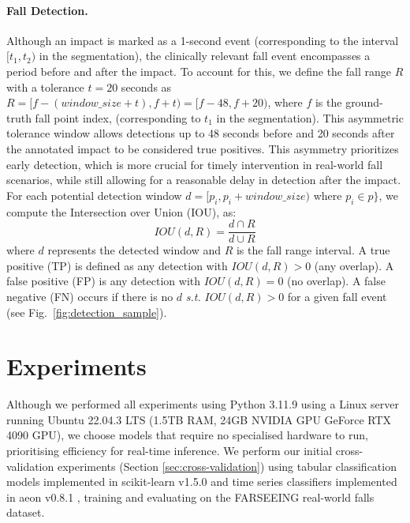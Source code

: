 \documentclass[runningheads]{llncs}
\begin{document}
\paragraph{Fall Detection.} Although an impact is marked as a 1-second event (corresponding to the interval $[t_1, t_2)$ in the segmentation), the clinically relevant fall event encompasses a period before and after the impact. To account for this, we define the fall range $R$ with a tolerance $t=20$ seconds as $R = [f-(window\_size+t), f+t)= [f-48,f+20)$, where $f$ is the ground-truth fall point index, (corresponding to $t_1$ in the segmentation). This asymmetric tolerance window allows detections up to 48 seconds before and 20 seconds after the annotated impact to be considered true positives. This asymmetry prioritizes early detection, which is more crucial for timely intervention in real-world fall scenarios, while still allowing for a reasonable delay in detection after the impact. For each potential detection window $d = [p_i, p_i+window\_size)$ where $p_i \in p\}$, we compute the Intersection over Union (IOU), as:
\begin{equation}
    IOU(d, R) = \frac{{ d \cap R}}{d \cup R}
\end{equation} 
where $d$ represents the detected window and $R$ is the fall range interval. A true positive (TP) is defined as any detection with  $IOU(d, R)>0$ (any overlap). A false positive (FP) is any detection with  $IOU(d, R)=0$ (no overlap). A false negative (FN) occurs if there is no $d$ \textit{s.t.} $IOU(d,R) > 0$ for a given fall event (see Fig.~\ref{fig:detection_sample}).

\section{Experiments}
\label{sec:experiments}


Although we performed all experiments using Python 3.11.9 using a Linux server running Ubuntu 22.04.3 LTS (1.5TB RAM, 24GB NVIDIA GPU GeForce RTX 4090 GPU), we choose models that require no specialised hardware to run, prioritising efficiency for real-time inference. We perform our initial cross-validation experiments (Section \ref{sec:cross-validation})  using tabular classification models implemented in scikit-learn v1.5.0 \cite{pedregosa2011scikit} and time series classifiers implemented in aeon v0.8.1 \cite{middlehurst2024aeon}, training and evaluating on the FARSEEING real-world falls dataset.
\end{document}
